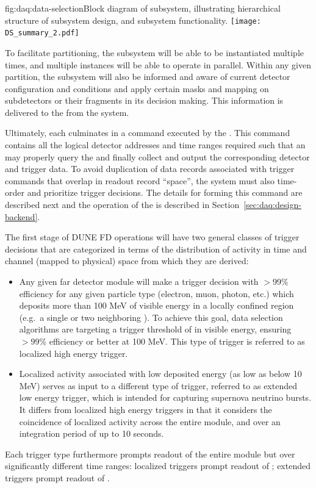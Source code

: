 \begin{dunefigure}{fig:daq:data-selection}{Block diagram of  
     subsystem, illustrating hierarchical structure of
    subsystem design, and subsystem functionality.}
  \texttt{[image: DS\_summary\_2.pdf]}
\end{dunefigure}

To facilitate partitioning, the  subsystem will be able to be
instantiated multiple times, and multiple instances will be able to operate in
parallel.
Within any given partition, the  subsystem will also be informed
and aware of current detector configuration and conditions and apply certain
masks and mapping on subdetectors or their fragments in its decision making.
This information is delivered to the  from the 
system.

Ultimately, each  culminates in a command executed by the
. 
This command contains all the logical detector addresses and time ranges
required such that an  may properly query the  and
finally collect and output the corresponding detector and trigger data.
To avoid duplication of data records associated with trigger commands that
overlap in readout record ``space'', the  system must also
time-order and prioritize trigger decisions.
The details for forming this command are described next and the operation of the
 is described in Section~\ref{sec:daq:design-backend}.

The first stage of DUNE FD operations will have two general classes of trigger
decisions that are categorized in terms of the distribution of activity
in time and channel (mapped to physical) space from which they are derived: 
\begin{itemize}
\item Any given far detector module will make a trigger decision with $>$99\%
  efficiency for any given particle type (electron, muon, photon, etc.) 
  which deposits more than 100 MeV of visible energy in a locally confined
  region (e.g.~a single or two neighboring ). To achieve this goal,
  data selection algorithms are targeting a trigger threshold of  in visible energy, ensuring $>99$\%
  efficiency or better at 100 MeV. 
  This type of trigger is referred to as localized high energy trigger.
\item Localized activity associated with low deposited energy (as low as below
  10 MeV) serves as input to a different type of trigger, referred to as
  extended low energy trigger, which is intended for capturing supernova
  neutrino bursts.
  It differs from localized high energy triggers in that it considers the
  coincidence of localized activity across the entire module, and over an
  integration period of up to 10 seconds.
\end{itemize}
Each trigger type furthermore prompts readout of the entire module but over
significantly different time ranges: localized triggers prompt readout of
\dpreadout; extended triggers prompt readout of \snbtime. 

